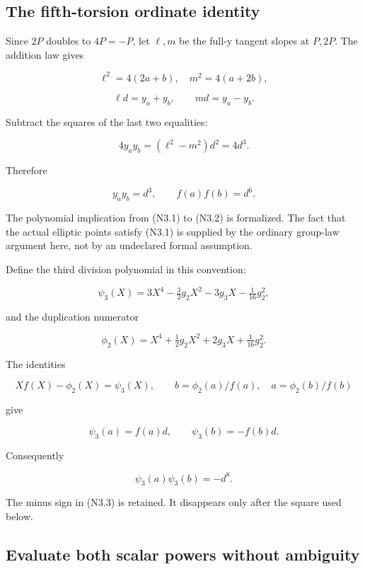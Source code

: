 \hypertarget{N-the-fifth-torsion-ordinate-identity}{%
\subsection{The fifth-torsion ordinate
identity}\label{N-the-fifth-torsion-ordinate-identity}}

Since \(2P\) doubles to \(4P=-P\), let \(\ell,m\) be the full-y tangent
slopes at \(P,2P\). The addition law gives

\[
 \ell^2=4(2a+b),\quad m^2=4(a+2b),
\]

\[
 \ell d=y_a+y_b,\qquad md=y_a-y_b.                       \tag{N3.1}
\]

Subtract the squares of the last two equalities:

\[
 4y_ay_b=(\ell^2-m^2)d^2=4d^3.
\]

Therefore

\[
 \boxed{y_ay_b=d^3,\qquad f(a)f(b)=d^6.}                 \tag{N3.2}
\]

The polynomial implication from (N3.1) to (N3.2) is formalized. The fact
that the actual elliptic points satisfy (N3.1) is supplied by the
ordinary group-law argument here, not by an undeclared formal
assumption.

Define the third division polynomial in this convention:

\[
 \psi_3(X)=3X^4-\tfrac32g_2X^2-3g_3X-\tfrac1{16}g_2^2,
\]

and the duplication numerator

\[
 \phi_2(X)=X^4+\tfrac12g_2X^2+2g_3X+\tfrac1{16}g_2^2.
\]

The identities

\[
 Xf(X)-\phi_2(X)=\psi_3(X),\qquad
 b=\phi_2(a)/f(a),\quad a=\phi_2(b)/f(b)
\]

give

\[
 \psi_3(a)=f(a)d,\qquad \psi_3(b)=-f(b)d.
\]

Consequently

\[
 \boxed{\psi_3(a)\psi_3(b)=-d^8.}                        \tag{N3.3}
\]

The minus sign in (N3.3) is retained. It disappears only after the
square used below.

\hypertarget{N-evaluate-both-scalar-powers-without-ambiguity}{%
\subsection{Evaluate both scalar powers without
ambiguity}\label{N-evaluate-both-scalar-powers-without-ambiguity}}

